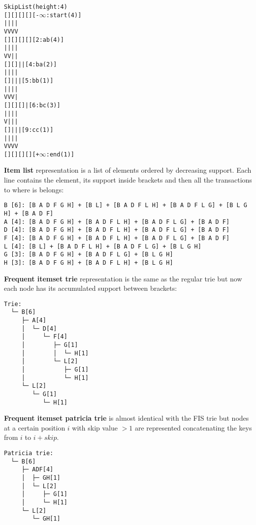 \documentclass[a4paper,10pt,table,xcdraw]{article}
\begin{document}
\begin{appendices}
\begin{alltt}
Skip List (height: 4)
[ ] [ ] [ ] [ ] [-\(\infty\) : start (4)]
 |   |   |   |  
 V   V   V   V  
[ ] [ ] [ ] [ ] [2: ab (4)]
 |   |   |   |  
 V   V   |   |  
[ ] [ ]  |   |  [4: ba (2)]
 |   |   |   |  
[ ]  |   |   |  [5: bb (1)]
 |   |   |   |  
 V   V   V   |  
[ ] [ ] [ ]  |  [6: bc (3)]
 |   |   |   |  
 V   |   |   |  
[ ]  |   |   |  [9: cc (1)]
 |   |   |   |  
 V   V   V   V  
[ ] [ ] [ ] [ ] [+\(\infty\): end (1)]
\end{alltt}


\textbf{Item list} representation is a list of elements ordered by decreasing support. Each line contains the element, its support inside brackets and then all the transactions to where is belongs:

\begin{verbatim}
B [6]: [B A D F G H] + [B L] + [B A D F L H] + [B A D F L G] + [B L G H] + [B A D F]
A [4]: [B A D F G H] + [B A D F L H] + [B A D F L G] + [B A D F]
D [4]: [B A D F G H] + [B A D F L H] + [B A D F L G] + [B A D F]
F [4]: [B A D F G H] + [B A D F L H] + [B A D F L G] + [B A D F]
L [4]: [B L] + [B A D F L H] + [B A D F L G] + [B L G H]
G [3]: [B A D F G H] + [B A D F L G] + [B L G H]
H [3]: [B A D F G H] + [B A D F L H] + [B L G H] 
\end{verbatim}

\textbf{Frequent itemset trie} representation is the same as the regular trie but now each node has its accumulated support between brackets:

\begin{verbatim}
Trie:
  └─ B[6]
     ├─ A[4]
     │  └─ D[4]
     │     └─ F[4]
     │        ├─ G[1]
     │        │  └─ H[1]
     │        └─ L[2]
     │           ├─ G[1]
     │           └─ H[1]
     └─ L[2]
        └─ G[1]
           └─ H[1]
\end{verbatim}

\textbf{Frequent itemset patricia trie} is almost identical with the FIS trie but nodes at a certain position $i$ with skip value $> 1$ are represented concatenating the keys from $i$ to $i+skip$.

\begin{verbatim}
Patricia trie:
  └─ B[6]
     ├─ ADF[4]
     │  ├─ GH[1]
     │  └─ L[2]
     │     ├─ G[1]
     │     └─ H[1]
     └─ L[2]
        └─ GH[1]
\end{verbatim}

\end{appendices}
\end{document}
